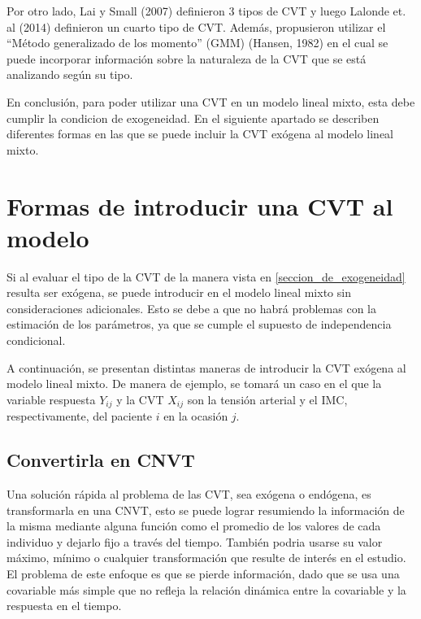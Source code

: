\documentclass[spanish]{article}
\numberwithin{figure}{subsection}
\numberwithin{equation}{subsection}
\numberwithin{table}{subsection}
\begin{document}
Por otro lado, Lai y Small (2007) definieron 3 tipos de CVT y luego Lalonde et.
al (2014) definieron un cuarto tipo de CVT. Además, propusieron utilizar el
``Método generalizado de los momento'' (GMM) (Hansen, 1982) en el cual se puede
incorporar información sobre la naturaleza de la CVT que se está analizando
según su tipo.

En conclusión, para poder utilizar una CVT en un modelo lineal mixto, esta debe
cumplir la condicion de exogeneidad. En el siguiente apartado se describen
diferentes formas en las que se puede incluir la CVT exógena al modelo lineal
mixto.

\newpage


\section{Formas de introducir una CVT al modelo}

Si al evaluar el tipo de la CVT de la manera vista en
\ref{seccion_de_exogeneidad} resulta ser exógena, se puede introducir en el
modelo lineal mixto sin consideraciones adicionales. Esto se debe a que no habrá
problemas con la estimación de los parámetros, ya que se cumple el supuesto de
independencia condicional.

A continuación, se presentan distintas maneras de introducir la CVT exógena al
modelo lineal mixto. De manera de ejemplo, se tomará un caso en el que la variable
respuesta $Y_{ij}$ y la CVT $X_{ij}$ son la tensión arterial y el IMC,
respectivamente, del paciente $i$ en la ocasión $j$.

\subsection{Convertirla en CNVT}

Una solución rápida al problema de las CVT, sea exógena o endógena, es
transformarla en una CNVT, esto se puede lograr resumiendo la información de la
misma mediante alguna función como el promedio de los valores de cada individuo
y dejarlo fijo a través del tiempo. También podria usarse su valor máximo,
mínimo o cualquier transformación que resulte de interés en el estudio. El
problema de este enfoque es que se pierde información, dado que se usa una
covariable más simple que no refleja la relación dinámica entre la covariable y
la respuesta en el tiempo.
\end{document}
